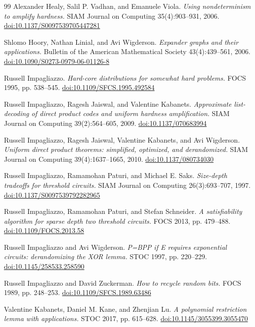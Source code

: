 \documentclass[11pt,letterpaper]{article}
\theoremstyle{definition}
\theoremstyle{remark}
\begin{document}
\begin{thebibliography}{99}
 Alexander Healy, Salil P. Vadhan, and Emanuele Viola.
\emph{Using nondeterminism to amplify hardness.} SIAM Journal on
Computing 35(4):903--931, 2006.
\href{https://doi.org/10.1137/S0097539705447281}{doi:10.1137/S0097539705447281}

 Shlomo Hoory, Nathan Linial, and Avi Wigderson.
\emph{Expander graphs and their applications.} Bulletin of the American
Mathematical Society 43(4):439--561, 2006.
\href{https://doi.org/10.1090/S0273-0979-06-01126-8}{doi:10.1090/S0273-0979-06-01126-8}

 Russell Impagliazzo. \emph{Hard-core distributions for
somewhat hard problems.} FOCS 1995, pp. 538--545.
\href{https://doi.org/10.1109/SFCS.1995.492584}{doi:10.1109/SFCS.1995.492584}

 Russell Impagliazzo, Ragesh Jaiswal, and Valentine Kabanets.
\emph{Approximate list-decoding of direct product codes and uniform
hardness amplification.} SIAM Journal on Computing 39(2):564--605,
2009. \href{https://doi.org/10.1137/070683994}{doi:10.1137/070683994}

 Russell Impagliazzo, Ragesh Jaiswal, Valentine Kabanets,
and Avi Wigderson. \emph{Uniform direct product theorems: simplified,
optimized, and derandomized.} SIAM Journal on Computing
39(4):1637--1665, 2010.
\href{https://doi.org/10.1137/080734030}{doi:10.1137/080734030}

 Russell Impagliazzo, Ramamohan Paturi, and Michael E. Saks.
\emph{Size-depth tradeoffs for threshold circuits.} SIAM Journal on
Computing 26(3):693--707, 1997.
\href{https://doi.org/10.1137/S0097539792282965}{doi:10.1137/S0097539792282965}

 Russell Impagliazzo, Ramamohan Paturi, and Stefan Schneider.
\emph{A satisfiability algorithm for sparse depth two threshold
circuits.} FOCS 2013, pp. 479--488.
\href{https://doi.org/10.1109/FOCS.2013.58}{doi:10.1109/FOCS.2013.58}

 Russell Impagliazzo and Avi Wigderson. \emph{P=BPP if E
requires exponential circuits: derandomizing the XOR lemma.} STOC 1997,
pp. 220--229.
\href{https://doi.org/10.1145/258533.258590}{doi:10.1145/258533.258590}

 Russell Impagliazzo and David Zuckerman. \emph{How to recycle
random bits.} FOCS 1989, pp. 248--253.
\href{https://doi.org/10.1109/SFCS.1989.63486}{doi:10.1109/SFCS.1989.63486}

 Valentine Kabanets, Daniel M. Kane, and Zhenjian Lu. \emph{A
polynomial restriction lemma with applications.} STOC 2017, pp.
615--628.
\href{https://doi.org/10.1145/3055399.3055470}{doi:10.1145/3055399.3055470}


\end{thebibliography}
\end{document}
